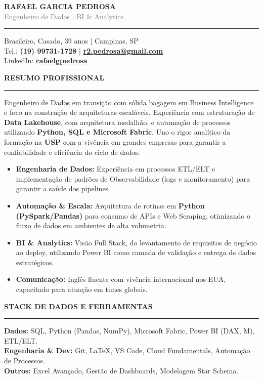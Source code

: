 \documentclass[11pt,a4paper]{article}
\newcommand{\resumosection}[1]{
    \vspace{4mm}
    {\large\textbf{\MakeUppercase{#1}}} %
    \vspace{1mm}
    \hrule %
    \vspace{4mm}    
    \vspace{-2mm}
}
\begin{document}
\noindent 
{\huge \textbf{RAFAEL GARCIA PEDROSA}} \\
\vspace{1mm}
{\large \textcolor{gray}{Engenheiro de Dados | BI \& Analytics}} \\
\vspace{1mm}
\hrule
\vspace{2mm}
\noindent 
Brasileiro, Casado, 39 anos | Campinas, SP \\
Tel.: \textbf{(19) 99731-1728} | \textbf{\href{mailto:r2.pedrosa@gmail.com}{r2.pedrosa@gmail.com}} \\
LinkedIn: \textbf{\href{https://www.linkedin.com/in/rafaelgpedrosa/}{rafaelgpedrosa}}

\vspace{4mm}

\resumosection{RESUMO PROFISSIONAL}
Engenheiro de Dados em transição com sólida bagagem em Business Intelligence e foco na construção de arquiteturas escaláveis. Experiência com estruturação de \textbf{Data Lakehouse}, com arquitetura medalhão, e automação de processos utilizando \textbf{Python, SQL e Microsoft Fabric}. Uno o rigor analítico da formação na \textbf{USP} com a vivência em grandes empresas para garantir a confiabilidade e eficiência do ciclo de dados.

\begin{itemize}
    \item \textbf{Engenharia de Dados:} Experiência em processos ETL/ELT e implementação de padrões de Observabilidade (logs e monitoramento) para garantir a saúde dos pipelines.
    \item \textbf{Automação \& Escala:} Arquitetura de rotinas em \textbf{Python (PySpark/Pandas)} para consumo de APIs e Web Scraping, otimizando o fluxo de dados em ambientes de alta volumetria.
    \item \textbf{BI \& Analytics:} Visão Full Stack, do levantamento de requisitos de negócio ao deploy, utilizando Power BI como camada de validação e entrega de dados estratégicos.
    \item \textbf{Comunicação:} Inglês fluente com vivência internacional nos EUA, capacitado para atuação em times globais.
\end{itemize}

\resumosection{Stack de Dados e Ferramentas}
\noindent
\textbf{Dados:} SQL, Python (Pandas, NumPy), Microsoft Fabric, Power BI (DAX, M), ETL/ELT. \\
\textbf{Engenharia \& Dev:} Git, LaTeX, VS Code, Cloud Fundamentals, Automação de Processos. \\
\textbf{Outros:} Excel Avançado, Gestão de Dashboards, Modelagem Star Schema.
\end{document}
